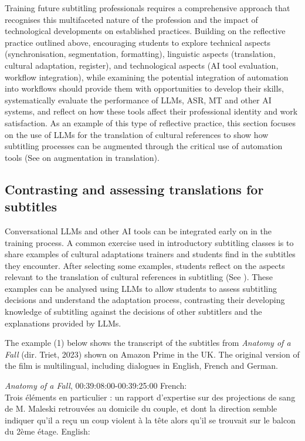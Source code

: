 \documentclass[output=paper]{langscibook}
\begin{document}
Training future subtitling professionals requires a comprehensive approach that recognises this multifaceted nature of the profession and the impact of technological developments on established practices. Building on the reflective practice outlined above, encouraging students to explore technical aspects (synchronisation, segmentation, formatting), linguistic aspects (translation, cultural adaptation, register), and technological aspects (AI tool evaluation, workflow integration), while examining the potential integration of automation into workflows should provide them with opportunities to develop their skills, systematically evaluate the performance of LLMs, ASR, MT and other AI systems, and reflect on how these tools affect their professional identity and work satisfaction. As an example of this type of reflective practice, this section focuses on the use of LLMs for the translation of cultural references to show how subtitling processes can be augmented through the critical use of automation tools (See \citealt{obrien_human-centered_2024} on augmentation in translation).

\subsection{Contrasting and assessing translations for subtitles}

Conversational LLMs and other AI tools can be integrated early on in the training process. A common exercise used in introductory subtitling classes is to share examples of cultural adaptations trainers and students find in the subtitles they encounter. After selecting some examples, students reflect on the aspects relevant to the translation of cultural references in subtitling (See \citealt{díaz-cintas2021subtitling}). These examples can be analysed using LLMs to allow students to assess subtitling decisions and understand the adaptation process, contrasting their developing knowledge of subtitling against the decisions of other subtitlers and the explanations provided by LLMs.

The example (1) below shows the transcript of the subtitles from \textit{Anatomy of a Fall} (dir. Triet, 2023) shown on Amazon Prime in the UK. The original version of the film is multilingual, including dialogues in English, French and German.

\newpage
\ea
\textit{Anatomy of a Fall}, 00:39:08:00-00:39:25:00
  \ea French: \\
  \ttfamily
  {Trois éléments en particulier : un rapport d’expertise sur des projections de sang de M. Maleski retrouvées au domicile du couple, et dont la direction semble indiquer qu’il a reçu un coup violent à la tête alors qu’il se trouvait sur le balcon du 2ème étage.}
  \ex English:\\
\end{document}

